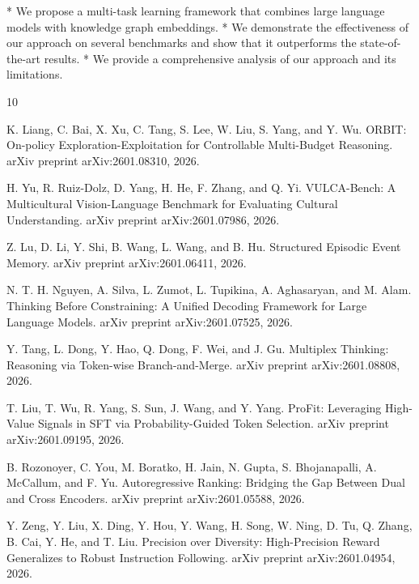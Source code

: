 \documentclass{article}
\begin{document}
* We propose a multi-task learning framework that combines large language models with knowledge graph embeddings.
* We demonstrate the effectiveness of our approach on several benchmarks and show that it outperforms the state-of-the-art results.
* We provide a comprehensive analysis of our approach and its limitations.

\begin{thebibliography}{10}

 K. Liang, C. Bai, X. Xu, C. Tang, S. Lee, W. Liu, S. Yang, and Y. Wu. ORBIT: On-policy Exploration-Exploitation for Controllable Multi-Budget Reasoning. arXiv preprint arXiv:2601.08310, 2026.

 H. Yu, R. Ruiz-Dolz, D. Yang, H. He, F. Zhang, and Q. Yi. VULCA-Bench: A Multicultural Vision-Language Benchmark for Evaluating Cultural Understanding. arXiv preprint arXiv:2601.07986, 2026.

 Z. Lu, D. Li, Y. Shi, B. Wang, L. Wang, and B. Hu. Structured Episodic Event Memory. arXiv preprint arXiv:2601.06411, 2026.

 N. T. H. Nguyen, A. Silva, L. Zumot, L. Tupikina, A. Aghasaryan, and M. Alam. Thinking Before Constraining: A Unified Decoding Framework for Large Language Models. arXiv preprint arXiv:2601.07525, 2026.

 Y. Tang, L. Dong, Y. Hao, Q. Dong, F. Wei, and J. Gu. Multiplex Thinking: Reasoning via Token-wise Branch-and-Merge. arXiv preprint arXiv:2601.08808, 2026.

 T. Liu, T. Wu, R. Yang, S. Sun, J. Wang, and Y. Yang. ProFit: Leveraging High-Value Signals in SFT via Probability-Guided Token Selection. arXiv preprint arXiv:2601.09195, 2026.

 B. Rozonoyer, C. You, M. Boratko, H. Jain, N. Gupta, S. Bhojanapalli, A. McCallum, and F. Yu. Autoregressive Ranking: Bridging the Gap Between Dual and Cross Encoders. arXiv preprint arXiv:2601.05588, 2026.

 Y. Zeng, Y. Liu, X. Ding, Y. Hou, Y. Wang, H. Song, W. Ning, D. Tu, Q. Zhang, B. Cai, Y. He, and T. Liu. Precision over Diversity: High-Precision Reward Generalizes to Robust Instruction Following. arXiv preprint arXiv:2601.04954, 2026.


\end{thebibliography}
\end{document}
